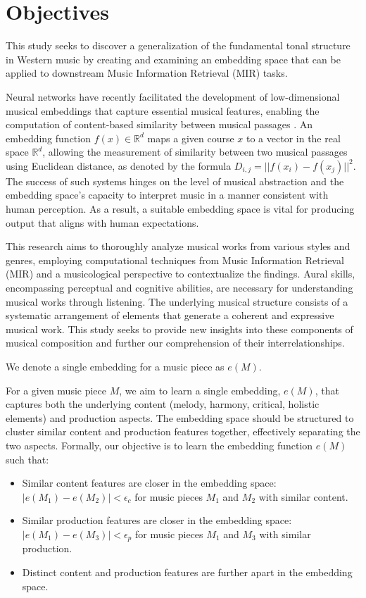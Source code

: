 \section{Objectives}

This study seeks to discover a generalization of the fundamental tonal structure in Western music by creating and examining an embedding space that can be applied to downstream Music Information Retrieval (MIR) tasks.

Neural networks have recently facilitated the development of low-dimensional musical embeddings that capture essential musical features, enabling the computation of content-based similarity between musical passages \cite{KimLEARNINGLOSS}\cite{Hung2022Feature-informedClassification}. An embedding function $f(x) \in \mathbb{R}^d$ maps a given course $x$ to a vector in the real space $\mathbb{R}^d$, allowing the measurement of similarity between two musical passages using Euclidean distance, as denoted by the formula $D_{i,j} = ||f(x_i) - f(x_j)||^2$. The success of such systems hinges on the level of musical abstraction and the embedding space's capacity to interpret music in a manner consistent with human perception. As a result, a suitable embedding space is vital for producing output that aligns with human expectations.

This research aims to thoroughly analyze musical works from various styles and genres, employing computational techniques from Music Information Retrieval (MIR) and a musicological perspective to contextualize the findings. Aural skills, encompassing perceptual and cognitive abilities, are necessary for understanding musical works through listening. The underlying musical structure consists of a systematic arrangement of elements that generate a coherent and expressive musical work. This study seeks to provide new insights into these components of musical composition and further our comprehension of their interrelationships.

We denote a single embedding for a music piece as $e(M)$.

For a given music piece $M$, we aim to learn a single embedding, $e(M)$, that captures both the underlying content (melody, harmony, critical, holistic elements) and production aspects. The embedding space should be structured to cluster similar content and production features together, effectively separating the two aspects. Formally, our objective is to learn the embedding function $e(M)$ such that:

\begin{itemize}
\item Similar content features are closer in the embedding space: $|e(M_1) - e(M_2)| < \epsilon_c$ for music pieces $M_1$ and $M_2$ with similar content.
\item Similar production features are closer in the embedding space: $|e(M_1) - e(M_3)| < \epsilon_p$ for music pieces $M_1$ and $M_3$ with similar production.
\item Distinct content and production features are further apart in the embedding space.
\end{itemize}

